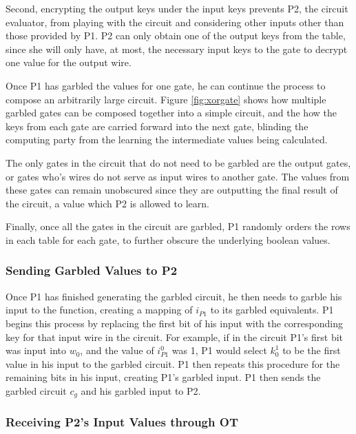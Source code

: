 Second, encrypting the output keys under the input keys prevents \ac{P2}, the circuit evaluator, from playing with the circuit and considering other inputs other than those provided by \ac{P1}. \ac{P2} can only obtain one of the output keys from the table, since she will only have, at most, the necessary input keys to the gate to decrypt one value for the output wire.

Once \ac{P1} has garbled the values for one gate, he can continue the process to compose an arbitrarily large circuit.  Figure \ref{fig:xorgate} shows how multiple garbled gates can be composed together into a simple circuit, and the how the keys from each gate are carried forward into the next gate, blinding the computing party from the learning the intermediate values being calculated.

The only gates in the circuit that do not need to be garbled are the output gates, or gates who's wires do not serve as input wires to another gate.  The values from these gates can remain unobscured since they are outputting the final result of the circuit, a value which \ac{P2} is allowed to learn.

Finally, once all the gates in the circuit are garbled, \ac{P1} randomly orders the rows in each table for each gate, to further obscure the underlying boolean values.

\subsubsection{Sending Garbled Values to \ac{P2}}

Once \ac{P1} has finished generating the garbled circuit, he then needs to garble his input to the function, creating a mapping of $i_{P1}$ to its garbled equivalents.  \ac{P1} begins this process by replacing the first bit of his input with the corresponding key for that input wire in the circuit.  For example, if in the circuit \ac{P1}'s first bit was input into $w_0$, and the value of $i^0_{P1}$ was 1, \ac{P1} would select $k^1_0$ to be the first value in his input to the garbled circuit. \ac{P1} then repeats this procedure for the remaining bits in his input, creating \ac{P1}'s garbled input. \ac{P1} then sends the garbled circuit $c_g$ and his garbled input to \ac{P2}.

\subsubsection{Receiving \ac{P2}'s Input Values through \ac{OT}}

